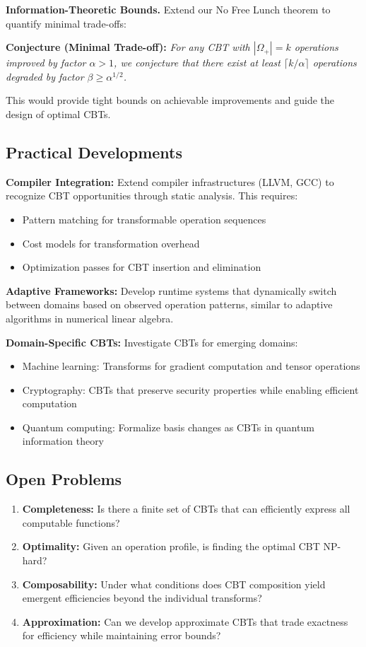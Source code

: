 \documentclass[11pt]{article}
\theoremstyle{definition}
\begin{document}
\textbf{Information-Theoretic Bounds.} Extend our No Free Lunch theorem to quantify minimal trade-offs:

\textbf{Conjecture (Minimal Trade-off):}
\emph{For any CBT with $|\Omega_+| = k$ operations improved by factor $\alpha > 1$, we conjecture that there exist at least $\lceil k/\alpha \rceil$ operations degraded by factor $\beta \geq \alpha^{1/2}$.}

This would provide tight bounds on achievable improvements and guide the design of optimal CBTs.

\subsection{Practical Developments}

\textbf{Compiler Integration:} Extend compiler infrastructures (LLVM, GCC) to recognize CBT opportunities through static analysis. This requires:
\begin{itemize}
\item Pattern matching for transformable operation sequences
\item Cost models for transformation overhead
\item Optimization passes for CBT insertion and elimination
\end{itemize}

\textbf{Adaptive Frameworks:} Develop runtime systems that dynamically switch between domains based on observed operation patterns, similar to adaptive algorithms in numerical linear algebra.

\textbf{Domain-Specific CBTs:} Investigate CBTs for emerging domains:
\begin{itemize}
\item Machine learning: Transforms for gradient computation and tensor operations
\item Cryptography: CBTs that preserve security properties while enabling efficient computation
\item Quantum computing: Formalize basis changes as CBTs in quantum information theory
\end{itemize}

\subsection{Open Problems}

\begin{enumerate}
\item \textbf{Completeness:} Is there a finite set of CBTs that can efficiently express all computable functions?
\item \textbf{Optimality:} Given an operation profile, is finding the optimal CBT NP-hard?
\item \textbf{Composability:} Under what conditions does CBT composition yield emergent efficiencies beyond the individual transforms?
\item \textbf{Approximation:} Can we develop approximate CBTs that trade exactness for efficiency while maintaining error bounds?
\end{enumerate}
\end{document}
